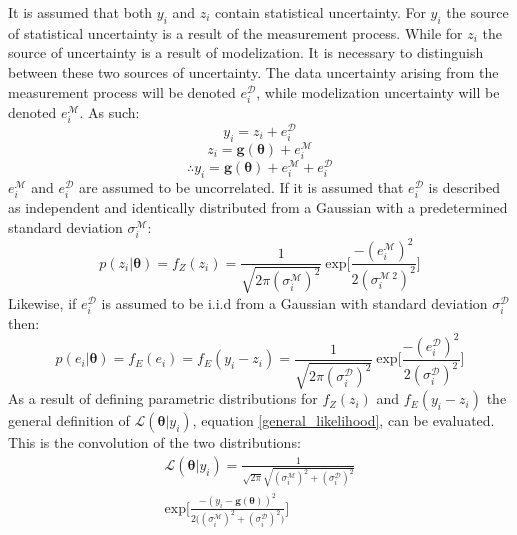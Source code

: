 \begin{tcolorbox}[enhanced jigsaw,breakable,pad at break*=1mm,title=Technical figure 2: Applied likelihood derivation, title filled,fonttitle=\sffamily\bfseries,fontupper=\sffamily\scriptsize,before upper={\parindent15pt}]
\label{tf2}
\begin{multicols}{2}
It is assumed that both $y_i$ and $z_i$ contain statistical uncertainty. For $y_i$ the source of statistical uncertainty is a result of the measurement process. While for $z_i$ the source of uncertainty is a result of modelization. It is necessary to distinguish between these two sources of uncertainty. The data uncertainty arising from the measurement process will be denoted $e^{\mathcal{D}}_i$, while modelization uncertainty will be denoted $e^{\mathcal{M}}_i$. As such:
\begin{equation}
y_i = z_i + e^{\mathcal{D}}_i
\end{equation}
\begin{equation}
z_i = \bm{g}(\bm{\theta}) + e^{\mathcal{M}}_i
\end{equation}
\begin{equation}
\therefore y_i = \bm{g}(\bm{\theta}) + e^{\mathcal{M}}_i + e^{\mathcal{D}}_i
\end{equation}
$e^{\mathcal{M}}_i$ and $e^{\mathcal{D}}_i$ are assumed to be uncorrelated. If it is assumed that $e^{\mathcal{D}}_i$ is described as independent and identically distributed from a Gaussian with a predetermined standard deviation $\sigma^{\mathcal{M}}_i$: 
\begin{equation}
p(z_i|\bm{\theta}) = f_Z(z_i) = \frac{1}{\sqrt{2\pi(\sigma^{\mathcal{M}}_i)^2}}\ \text{exp}\bigg[\frac{-(e^{\mathcal{M}}_i)^2}{2(\sigma^{\mathcal{M}\ 2}_i)^2} \bigg]
\end{equation} 
Likewise, if $e^{\mathcal{D}}_i$ is assumed to be i.i.d from a Gaussian with standard deviation $\sigma^{\mathcal{D}}_i$ then:
\begin{equation}
p(e_i|\bm{\theta}) = f_E(e_i) = f_E(y_i-z_i) = \frac{1}{\sqrt{2\pi(\sigma^{\mathcal{D}}_i)^2}}\ \text{exp}\bigg[\frac{-(e^{\mathcal{D}}_i)^2}{2(\sigma^{\mathcal{D}}_i)^2} \bigg]
\end{equation}
As a result of defining parametric distributions for $f_Z(z_i)$ and $f_E(y_i-z_i)$ the general definition of $\mathcal{L}(\bm{\theta}|y_i)$, equation \ref{general_likelihood}, can be evaluated. This is the convolution of the two distributions: 
\begin{equation}
\begin{split}
\mathcal{L}(\bm{\theta}|y_i) = \frac{1}{\sqrt{2\pi}\sqrt{(\sigma^{\mathcal{M}}_i)^2+(\sigma^{\mathcal{D}}_i)^2}}\\
\text{exp}\bigg[\frac{-(y_i-\bm{g}(\bm{\theta}))^2}{2\big((\sigma^{\mathcal{M}}_i)^2+(\sigma^{\mathcal{D}}_i)^2\big)}\bigg]
\end{split}
\label{single-data-likelihood}
\end{equation}\par


\end{multicols}
\end{tcolorbox}
